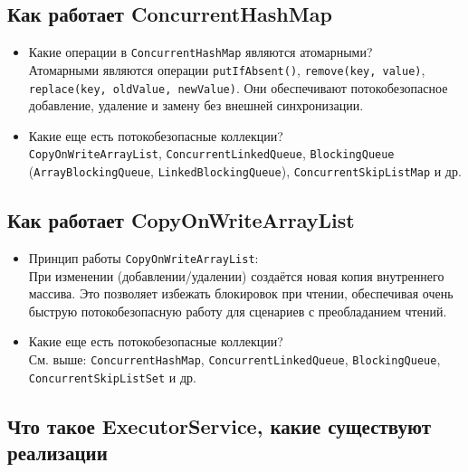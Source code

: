 \documentclass[a4paper,14pt]{article}
\begin{document}
\subsection{Как работает ConcurrentHashMap}

\begin{itemize}
\item Какие операции в \texttt{ConcurrentHashMap} являются атомарными? \\
Атомарными являются операции \texttt{putIfAbsent()}, \texttt{remove(key, value)}, \texttt{replace(key, oldValue, newValue)}. Они обеспечивают потокобезопасное добавление, удаление и замену без внешней синхронизации.

\item Какие еще есть потокобезопасные коллекции? \\
\texttt{CopyOnWriteArrayList}, \texttt{ConcurrentLinkedQueue}, \texttt{BlockingQueue} (\texttt{ArrayBlockingQueue}, \texttt{LinkedBlockingQueue}), \texttt{ConcurrentSkipListMap} и др.
\end{itemize}

\subsection{Как работает CopyOnWriteArrayList}

\begin{itemize}
\item Принцип работы \texttt{CopyOnWriteArrayList}: \\
При изменении (добавлении/удалении) создаётся новая копия внутреннего массива. Это позволяет избежать блокировок при чтении, обеспечивая очень быструю потокобезопасную работу для сценариев с преобладанием чтений.

\item Какие еще есть потокобезопасные коллекции? \\
См. выше: \texttt{ConcurrentHashMap}, \texttt{ConcurrentLinkedQueue}, \texttt{BlockingQueue}, \texttt{ConcurrentSkipListSet} и др.
\end{itemize}

\subsection{Что такое ExecutorService, какие существуют реализации}
\end{document}
